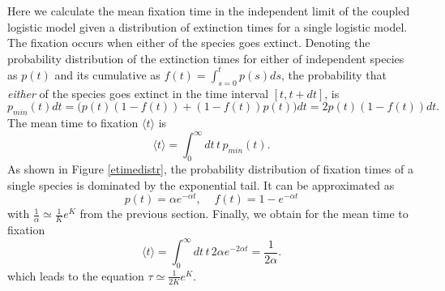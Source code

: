 Here we calculate the mean fixation time in the independent limit of the coupled logistic model given a distribution of extinction times for a single logistic model. The fixation occurs when either of the species goes extinct. Denoting the probability distribution of the extinction times for either of independent species as $p(t)$ and its cumulative  as $f(t)=\int_{s=0}^t p(s)ds$, the probability that \emph{either} of the species goes extinct in the time interval $[t,t+dt]$, is 
\begin{equation}
p_{min}(t)dt = \bigg(p(t)\left(1-f(t)\right)+\left(1-f(t)\right)p(t)\bigg)dt = 2p(t)\left(1-f(t)\right)dt.
\end{equation}
The mean time to fixation $\langle t\rangle$ is 
\begin{equation}
\langle t\rangle = \int_0^\infty dt\, t\, p_{min}(t).
\end{equation}
As shown in Figure \ref{etimedistr}, the probability distribution of fixation times of a single species is dominated by the exponential tail. It can be approximated as
\begin{equation}
p(t) = \alpha e^{-\alpha t},\;\;\;\;  f(t) = 1 - e^{-\alpha t}
\end{equation}
with $\frac{1}{\alpha}\simeq \frac{1}{K}e^K$ from the previous section.
Finally, we obtain for the mean time to fixation
\begin{equation}
\langle t\rangle = \int_0^\infty dt\, t\, 2\alpha e^{-2\alpha t} = \frac{1}{2\alpha}. \label{indietime}
\end{equation}
which leads to the equation $\tau \simeq \frac{1}{2K} e^K$. 


